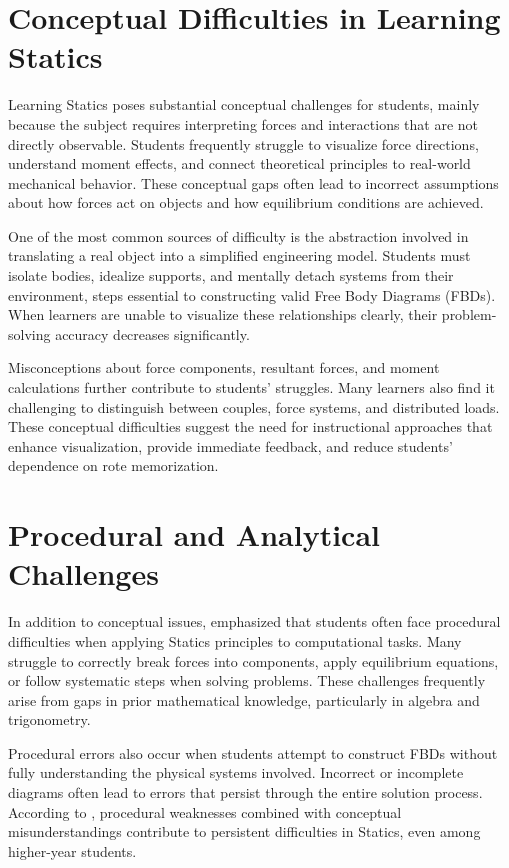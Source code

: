 \section{Conceptual Difficulties in Learning Statics}

Learning Statics poses substantial conceptual challenges for students, mainly because the subject requires interpreting forces and interactions that are not directly observable. Students frequently struggle to visualize force directions, understand moment effects, and connect theoretical principles to real-world mechanical behavior. These conceptual gaps often lead to incorrect assumptions about how forces act on objects and how equilibrium conditions are achieved.

One of the most common sources of difficulty is the abstraction involved in translating a real object into a simplified engineering model. Students must isolate bodies, idealize supports, and mentally detach systems from their environment, steps essential to constructing valid Free Body Diagrams (FBDs). When learners are unable to visualize these relationships clearly, their problem-solving accuracy decreases significantly.

Misconceptions about force components, resultant forces, and moment calculations further contribute to students’ struggles. Many learners also find it challenging to distinguish between couples, force systems, and distributed loads. These conceptual difficulties suggest the need for instructional approaches that enhance visualization, provide immediate feedback, and reduce students’ dependence on rote memorization.


\section{Procedural and Analytical Challenges}

In addition to conceptual issues, \cite{salami_challenges_2025} emphasized that students often face procedural difficulties when applying Statics principles to computational tasks. Many struggle to correctly break forces into components, apply equilibrium equations, or follow systematic steps when solving problems. These challenges frequently arise from gaps in prior mathematical knowledge, particularly in algebra and trigonometry.

Procedural errors also occur when students attempt to construct FBDs without fully understanding the physical systems involved. Incorrect or incomplete diagrams often lead to errors that persist through the entire solution process. According to \cite{salami_challenges_2025}, procedural weaknesses combined with conceptual misunderstandings contribute to persistent difficulties in Statics, even among higher-year students.


